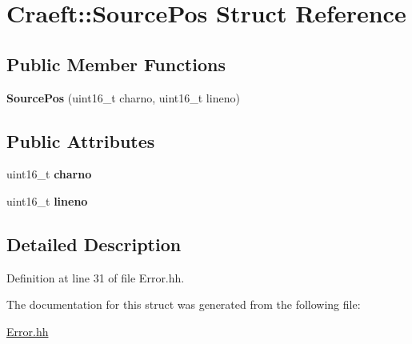 \hypertarget{struct_craeft_1_1_source_pos}{}\section{Craeft\+:\+:Source\+Pos Struct Reference}
\label{struct_craeft_1_1_source_pos}
\subsection*{Public Member Functions}
\begin{DoxyCompactItemize}
\item 
\hypertarget{struct_craeft_1_1_source_pos_a8bdad625b6772cbc447aaa470a6182de}{}\label{struct_craeft_1_1_source_pos_a8bdad625b6772cbc447aaa470a6182de} 
{\bfseries Source\+Pos} (uint16\+\_\+t charno, uint16\+\_\+t lineno)
\end{DoxyCompactItemize}
\subsection*{Public Attributes}
\begin{DoxyCompactItemize}
\item 
\hypertarget{struct_craeft_1_1_source_pos_a8158cf29de6026a22439dd55864c822e}{}\label{struct_craeft_1_1_source_pos_a8158cf29de6026a22439dd55864c822e} 
uint16\+\_\+t {\bfseries charno}
\item 
\hypertarget{struct_craeft_1_1_source_pos_aacb508675e6f3373c3e80593c21f79f6}{}\label{struct_craeft_1_1_source_pos_aacb508675e6f3373c3e80593c21f79f6} 
uint16\+\_\+t {\bfseries lineno}
\end{DoxyCompactItemize}


\subsection{Detailed Description}


Definition at line 31 of file Error.\+hh.



The documentation for this struct was generated from the following file\+:\begin{DoxyCompactItemize}
\item 
\hyperlink{_error_8hh}{Error.\+hh}\end{DoxyCompactItemize}
